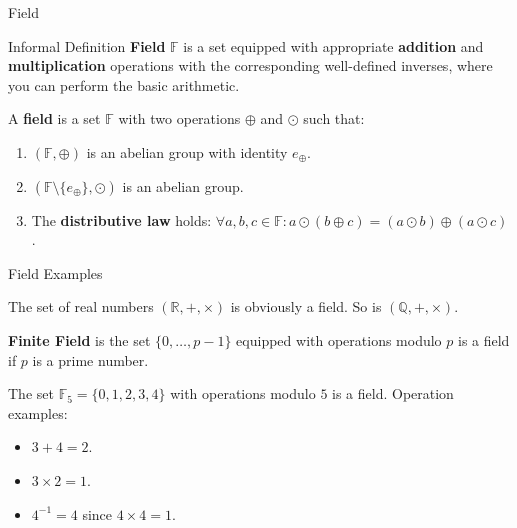 \documentclass{beamer}
\begin{document}
  \begin{frame}{Field}
    \begin{block}{Informal Definition}
        \textbf{Field} $\mathbb{F}$ is a set equipped with appropriate \textbf{addition} and \textbf{multiplication} operations with the corresponding well-defined inverses, where you can perform the basic arithmetic.
    \end{block}
    \pause
    
      \begin{definition}
        A \textbf{field} is a set $\mathbb{F}$ with two operations $\oplus$ and $\odot$ such that:
        \begin{enumerate}
            \item $(\mathbb{F}, \oplus)$ is an abelian group with identity $e_{\oplus}$.
            \item $(\mathbb{F} \setminus \{e_{\oplus}\}, \odot)$ is an abelian group.
            \item The \textbf{distributive law} holds: $\forall a,b,c \in \mathbb{F}: a \odot (b \oplus c) = (a \odot b) \oplus (a \odot c)$.
        \end{enumerate}
      \end{definition}
    \end{frame}

    \begin{frame}{Field Examples}
      \begin{example}
        The set of real numbers $(\mathbb{R}, +, \times)$ is obviously a field. So is $(\mathbb{Q}, +, \times)$.
    \end{example}
    \pause

    \begin{definition}
      \textbf{Finite Field} is the set $\{0,\dots,p-1\}$ equipped with operations modulo $p$ is a field if $p$ is a prime number.
    \end{definition}
    \pause

    \begin{example}
      The set $\mathbb{F}_5 = \{0,1,2,3,4\}$ with operations modulo $5$ is a field. Operation examples:
      \begin{itemize}
        \item $3 + 4 = 2$.
        \item $3 \times 2 = 1$.
        \item $4^{-1} = 4$ since $4 \times 4 = 1$.
      \end{itemize}
    \end{example}
    \end{frame}
\end{document}
